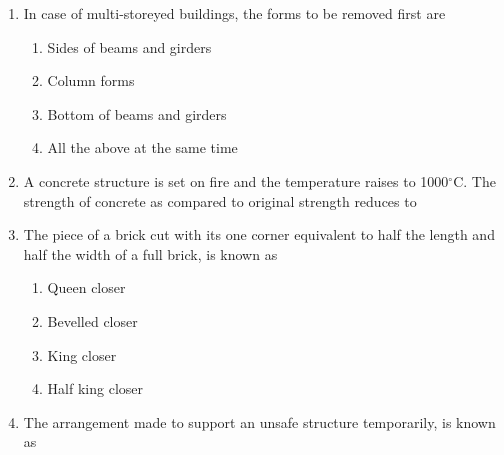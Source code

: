 \documentclass[11pt,a4paper]{article}
\begin{document}
\begin{enumerate}
\\
\item{In case of multi-storeyed buildings, the forms to be removed first are}
\begin{enumerate}[label=\Alph*.]
\item{Sides of beams and girders}
\item{Column forms}
\item{Bottom of beams and girders}
\item{All the above at the same time}
\end{enumerate}
\item{A concrete structure is set on fire and the temperature raises to 1000$^\circ$C. The strength of concrete as compared to original strength reduces to
}
\\
\item{The piece of a brick cut with its one corner equivalent to half the length and half the width of a full brick, is known as}
\begin{enumerate}[label=\Alph*.]
\item{Queen closer}
\item{Bevelled closer}
\item{King closer}
\item{Half king closer}
\end{enumerate}
\item{The arrangement made to support an unsafe structure temporarily, is known as}
\\

\end{enumerate}
\end{document}
